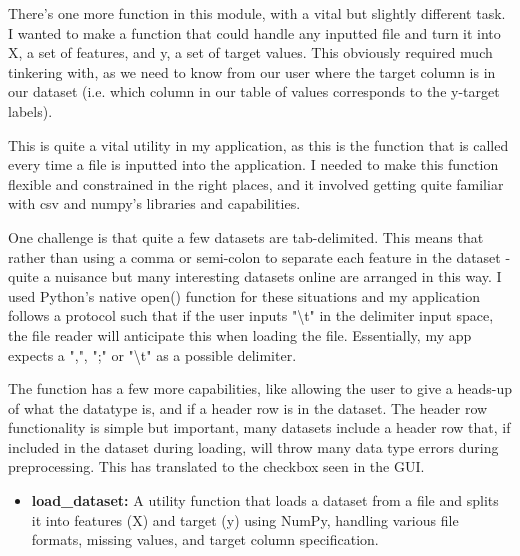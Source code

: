 \documentclass[letterpaper,10pt]{article}
\begin{document}
There's one more function in this module, with a vital but slightly different task. I wanted to make a function that could handle any inputted file and turn it into X, a set of features, and y, a set of target values. This obviously required much tinkering with, as we need to know from our user where the target column is in our dataset (i.e. which column in our table of values corresponds to the y-target labels). \par
This is quite a vital utility in my application, as this is the function that is called every time a file is inputted into the application. I needed to make this function flexible and constrained in the right places, and it involved getting quite familiar with csv and numpy's libraries and capabilities. \par
One challenge is that quite a few datasets are tab-delimited. This means that rather than using a comma or semi-colon to separate each feature in the dataset - quite a nuisance but many interesting datasets online are arranged in this way. I used Python's native open() function for these situations and my application follows a protocol such that if the user inputs "\textbackslash t" in the delimiter input space, the file reader will anticipate this when loading the file. Essentially, my app expects a ",", ";" or "\textbackslash t" as a possible delimiter. \par
The function has a few more capabilities, like allowing the user to give a heads-up of what the datatype is, and if a header row is in the dataset. The header row functionality is simple but important, many datasets include a header row that, if included in the dataset during loading, will throw many data type errors during preprocessing. This has translated to the checkbox seen in the GUI. \par

\begin{itemize}
 
\item \textbf{{load\_dataset}:} A utility function that loads a dataset from a file and splits it into features (X) and target (y) using NumPy, handling various file formats, missing values, and target column specification.

\end{itemize}
\end{document}
